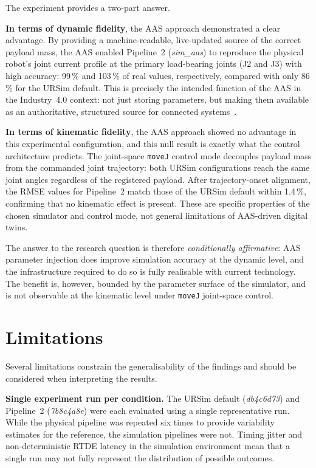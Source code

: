 The experiment provides a two-part answer.

\textbf{In terms of dynamic fidelity}, the AAS approach demonstrated a clear advantage.
By providing a machine-readable, live-updated source of the correct payload mass, the AAS
enabled Pipeline~2 (\textit{sim\_aas}) to reproduce the physical robot's joint current profile
at the primary load-bearing joints (J2 and J3) with high accuracy: 99\,\% and 103\,\% of real
values, respectively, compared with only 86\,\% for the URSim default.
This is precisely the intended function of the AAS in the Industry~4.0 context: not just storing
parameters, but making them available as an authoritative, structured source for connected
systems~\cite{IDTA_AAS_Part1, Bader2021}.

\textbf{In terms of kinematic fidelity}, the AAS approach showed no advantage in this
experimental configuration, and this null result is exactly what the control architecture
predicts.
The joint-space \texttt{moveJ} control mode decouples payload mass from the commanded joint
trajectory: both URSim configurations reach the same joint angles regardless of the registered
payload.
After trajectory-onset alignment, the RMSE values for Pipeline~2 match those of the URSim
default within 1.4\,\%, confirming that no kinematic effect is present.
These are specific properties of the chosen simulator and control mode, not general
limitations of AAS-driven digital twins.

The answer to the research question is therefore \emph{conditionally affirmative}: AAS parameter
injection does improve simulation accuracy at the dynamic level, and the infrastructure required
to do so is fully realisable with current technology.
The benefit is, however, bounded by the parameter surface of the simulator, and is not
observable at the kinematic level under \texttt{moveJ} joint-space control.


\section{Limitations}
\label{sec:discussion_limitations}

Several limitations constrain the generalisability of the findings and should be considered when
interpreting the results.

\textbf{Single experiment run per condition.}
The URSim default (\textit{db4c6d73}) and Pipeline~2 (\textit{7b8c4a8e}) were each evaluated
using a single representative run.
While the physical pipeline was repeated six times to provide variability estimates for the
reference, the simulation pipelines were not.
Timing jitter and non-deterministic RTDE latency in the simulation environment mean that
a single run may not fully represent the distribution of possible outcomes.

